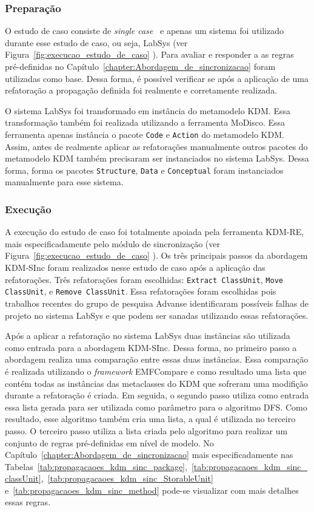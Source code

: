 \subsubsection{Preparação}

O estudo de caso consiste de \textit{single case}~\cite{yin2013} e apenas um sistema foi utilizado durante esse estudo de caso, ou seja, LabSys (ver Figura~\ref{fig:execucao_estudo_de_caso} ). Para avaliar e responder a  as regras pré-definidas no Capítulo~\ref{chapter:Abordagem_de_sincronizacao} foram utilizadas como base. Dessa forma, é possível verificar se após a aplicação de uma refatoração a propagação definida foi realmente e corretamente realizada.

O sistema LabSys foi transformado em instância do metamodelo KDM. Essa transformação também foi realizada utilizando a ferramenta MoDisco. Essa ferramenta apenas instância o pacote \texttt{Code} e \texttt{Action} do metamodelo KDM. Assim, antes de realmente aplicar as refatorações manualmente outros pacotes do metamodelo KDM também precisaram ser instanciados no sistema LabSys. Dessa forma, forma os pacotes \texttt{Structure}, \texttt{Data} e \texttt{Conceptual} foram instanciados manualmente para esse sistema. 


\subsubsection{Execução}

A execução do estudo de caso foi totalmente apoiada pela ferramenta KDM-RE, mais especificadamente pelo módulo de sincronização (ver Figura~\ref{fig:execucao_estudo_de_caso} ). Os três principais passos da abordagem KDM-SInc foram realizados nesse estudo de caso após a aplicação das refatorações. Três refatorações foram escolhidas: \texttt{Extract ClassUnit}, \texttt{Move ClassUnit}, e \texttt{Remove ClassUnit}. Essa refatorações foram escolhidas pois trabalhos recentes do grupo de pesquisa Advanse identificaram possíveis falhas de projeto no sistema LabSys e que podem ser sanadas utilizando essas refatorações.

Após a aplicar a refatoração no sistema LabSys duas instâncias são utilizada como entrada para a abordagem KDM-SInc. Dessa forma, no primeiro passo a abordagem realiza uma comparação entre essas duas instâncias. Essa comparação é realizada utilizando o \textit{framework} EMFCompare e como resultado uma lista que contém todas as instâncias das metaclasses do KDM que sofreram uma modifição durante a refatoração é criada. Em seguida, o segundo passo utiliza como entrada essa lista gerada para ser utilizada como parâmetro para o algoritmo DFS. Como resultado, esse algoritmo também cria uma lista, a qual é utilizada no terceiro passo. O terceiro passo utiliza a lista criada pelo algoritmo para realizar um conjunto de regras pré-definidas em nível de modelo. No Capítulo~\ref{chapter:Abordagem_de_sincronizacao} mais especificadamente nas Tabelas~\ref{tab:propagacaoes_kdm_sinc_package},~\ref{tab:propagacaoes_kdm_sinc_classUnit},~\ref{tab:propagacaoes_kdm_sinc_StorableUnit} e~\ref{tab:propagacaoes_kdm_sinc_method} pode-se visualizar com mais detalhes essas regras.

